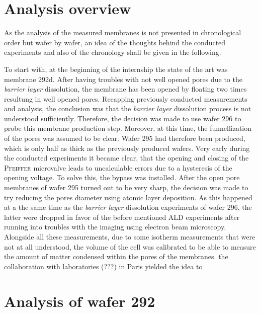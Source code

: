 \documentclass[thesis.tex]{subfiles}
\begin{document}
    \section{Analysis overview}
    \label{sec:analysis-overeview}

      As the analysis of the measured membranes is not presented in chronological order but wafer by wafer, an idea of the thoughts behind the conducted experiments and also of the chronology shall be given in the following.


      To start with, at the beginning of the internship the state of the art was membrane 292d. After having troubles with not well opened pores due to the \textit{barrier layer} dissolution, the membrane has been opened by floating two times resultung in well opened pores. Recapping previously conducted measurements and analysis, the conclusion was that the \textit{barrier layer} dissolution process is not understood sufficiently. Therefore, the decision was made to use wafer 296 to probe this membrane production step. Moreover, at this time, the funnellization of the pores was assumed to be clear. Wafer 295 had therefore been produced, which is only half as thick as the previously produced wafers. Very early during the conducted experiments it became clear, that the opening and closing of the \textsc{Pfeiffer} microvalve leads to uncalculable errors due to a hysteresis of the opening voltage. To solve this, the bypass was installed. After the open pore membranes of wafer 295 turned out to be very sharp, the decision was made to try reducing the pores diameter using atomic layer deposition. As this happened at a the same time as the \textit{barrier layer} dissolution experiments of wafer 296, the latter were dropped in favor of the before mentioned ALD experiments after running into troubles with the imaging using electron beam microscopy.  Alongside all these measurements, due to some isotherm measurements that were not at all understood, the volume of the cell was calibrated to be able to measure the amount of matter condensed within the pores of the membranes. the collaboration with laboratories (???) in Paris yielded the idea to

    \section{Analysis of wafer 292}
    \label{sec:wafer292}
\end{document}
